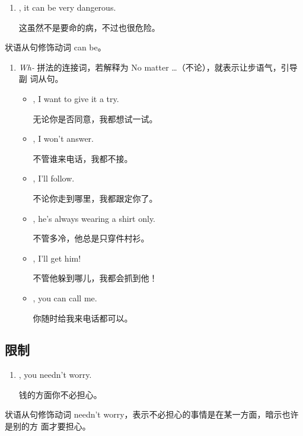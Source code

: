 \begin{enumerate}[resume]
\item {} , it can be
  very dangerous.

  这虽然不是要命的病，不过也很危险。
\end{enumerate}
状语从句修饰动词 can be。

\begin{enumerate}[resume]
\item \emph{Wh-} 拼法的连接词，若解释为 No matter \ldots（不论），就表示让步语气，引导副
  词从句。

\begin{itemize}
\item {} , I want
  to give it a try.

  无论你是否同意，我都想试一试。
\item {}, I won't answer.

  不管谁来电话，我都不接。
\item {}, I'll
  follow.

  不论你走到哪里，我都跟定你了。
\item {}, he's always
  wearing a shirt only.

  不管多冷，他总是只穿件村衫。
\item {}, I'll get
  him!

  不管他躲到哪儿，我都会抓到他！
\item {}, you can call me.

  你随时给我来电话都可以。
\end{itemize}
\end{enumerate}


\subsection{限制}

\begin{enumerate}
\item {} , you needn't
  worry.

  钱的方面你不必担心。
\end{enumerate}
状语从句修饰动词 needn't worry，表示不必担心的事情是在某一方面，暗示也许是别的方
面才要担心。

